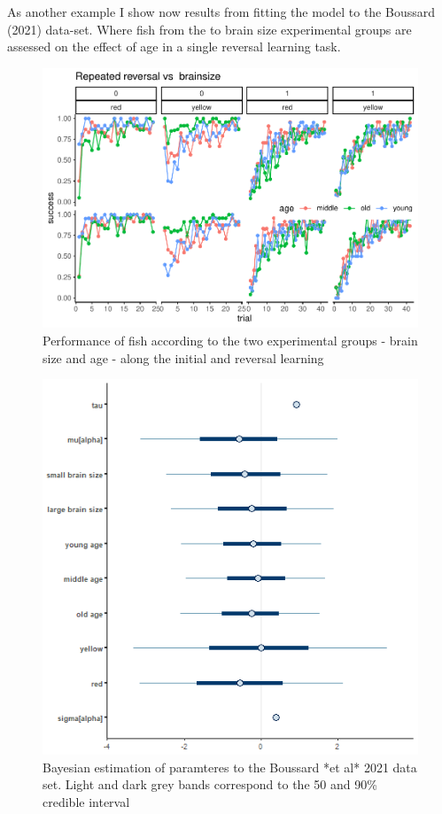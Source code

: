\documentclass[
]{article}
\begin{document}
As another example I show now results from fitting the model to the
Boussard (2021) data-set. Where fish from the to brain size experimental
groups are assessed on the effect of age in a single reversal learning
task.

\begin{figure}

\includegraphics{report_files/figure-latex/unnamed-chunk-10-1} \hfill{}

\caption{Performance of fish according to the two experimental groups  - brain size and age - along the initial and reversal learning}\label{fig:unnamed-chunk-10}
\end{figure}

\begin{figure}

\includegraphics[width=6.67in,]{images/boussard2intervals_col} \hfill{}

\caption{Bayesian estimation of paramteres to the Boussard *et al* 2021 data set. Light and dark grey bands correspond to the 50 and 90\% credible interval}\label{fig:unnamed-chunk-11}
\end{figure}
\end{document}
